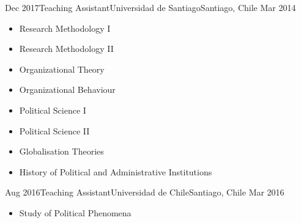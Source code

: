 \begin{experiences}
  \emptySeparator 
  \experience 
    {Dec 2017}{Teaching Assistant}{Universidad de Santiago}{Santiago, Chile} {Mar 2014}
    {\begin{itemize}
    \item Research Methodology I
    \item Research Methodology II
    \item Organizational Theory
    \item Organizational Behaviour
    \item Political Science I
    \item Political Science II
    \item Globalisation Theories
    \item History of Political and Administrative Institutions
    \end{itemize}}
    {}
\end{experiences}
\vspace{-2mm}

\begin{experiences}
  \emptySeparator 
  \experience 
    {Aug 2016}{Teaching Assistant}{Universidad de Chile}{Santiago, Chile} {Mar 2016}
    {\begin{itemize}
    \item Study of Political Phenomena
    \end{itemize}}
    {}
\end{experiences}
